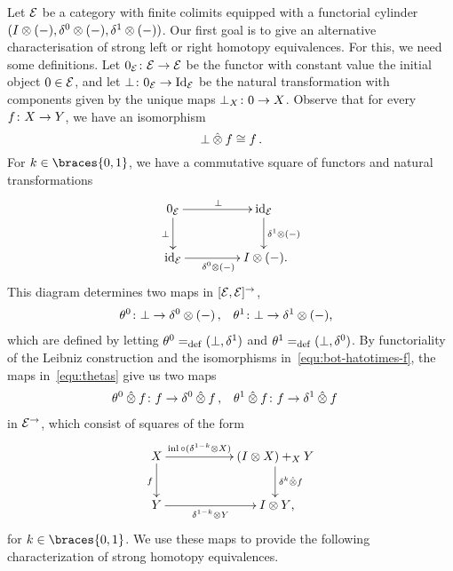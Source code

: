\documentclass[reqno,10pt,a4paper,oneside,draft]{amsart}
\begin{document}
Let $\mathcal{E}$ be a category with finite colimits equipped with a functorial cylinder $(I \otimes (-), \delta^0 \otimes (-), \delta^1 \otimes (-))$.
Our first goal is to give an alternative characterisation of strong left or right homotopy equivalences.
For this, we need some definitions.
Let $0_{\mathcal{E}} \colon \mathcal{E} \to \mathcal{E}$ be the functor with constant value the initial object $0 \in \mathcal{E}$, and let $\bot \colon 0_{\mathcal{E}} \rightarrow \operatorname{Id}_{\mathcal{E}}$ be the natural transformation with components given by the unique maps $\bot_X \colon 0 \to X$.
Observe that for every $f \colon X \to Y$, we have an isomorphism
\begin{equation}
\label{equ:bot-hatotimes-f}
\bot \mathbin{\hat{\otimes}} f \cong f \, .
\end{equation}
For $k \in \braces{0, 1}$, we have a commutative square of functors and natural transformations
\[
\xymatrix@C+2em{
  0_\catE
  \ar[r]^{\bot}
  \ar[d]_{\bot}
&
  \id_\catE
  \ar[d]^{\rcyl \otimes (-)}
\\
  \id_\catE
  \ar[r]_{\lcyl \otimes (-)}
&
  \interval \otimes (-)
\rlap{.}}
\]
This diagram determines two maps in $[\mathcal{E}, \mathcal{E}]^\to$,
\begin{equation} \label{equ:thetas}
\begin{aligned}
  \thetal &\co \bot \rightarrow \lcyl \otimes (-)
\, ,&
  \thetar &\co \bot \rightarrow \rcyl \otimes (-) \rlap{,}
\end{aligned}
\end{equation}
which are defined by letting $\theta^0 =_{\operatorname{def}} (\bot, \delta^1)$ and $\theta^1 =_{\operatorname{def}} (\bot, \delta^0)$.
By functoriality of the Leibniz construction and the isomorphisms in~\eqref{equ:bot-hatotimes-f}, the maps in~\eqref{equ:thetas} give us two maps
\begin{equation*}
\begin{aligned}
  \theta^0 \mathbin{\hat{\otimes}} f &\colon f \to \delta^0 \mathbin{\hat{\otimes}} f
\, ,&
  \theta^1 \mathbin{\hat{\otimes}} f &\colon f \to \delta^1 \mathbin{\hat{\otimes}} f
\end{aligned}
\end{equation*}
in $\mathcal{E}^\to$, which consist of squares of the form
\[
\xymatrix@C+3em{
  X
  \ar[r]^-{\inl \cc (\kcylinv \otimes X)}
  \ar[d]_{f}
&
  (\interval \otimes X) +_{X} Y \ar[d]^{\kcyl \hatotimes f}
\\
  Y
  \ar[r]_-{\kcylinv \otimes Y}
&
  \interval \otimes Y
\rlap{,}}
\]
for $k \in \braces{0, 1}$.
We use these maps to provide the following characterization of strong homotopy equivalences.
\end{document}
